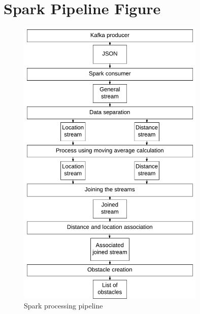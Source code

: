 \documentclass[prodmode,acmtosem]{acmsmall} %
\begin{document}
\section{Spark Pipeline Figure}
\label{app:SparkPipeline}
\begin{figure}[!ht]
\label{fig:SparkPipeline}
\centering
\includegraphics[width=0.8\textwidth]{SparkPipeline.pdf}
\caption{Spark processing pipeline}
\end{figure}
\clearpage
\end{document}
